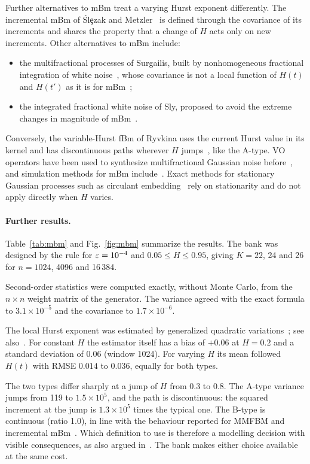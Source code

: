 Further alternatives to mBm treat a varying Hurst exponent differently. The incremental mBm of \'Sl\c{e}zak and Metzler~\cite{slezak2023} is defined through the covariance of its increments and shares the property that a change of $H$ acts only on new increments. Other alternatives to mBm include:
\begin{itemize}
\item the multifractional processes of Surgailis, built by nonhomogeneous fractional integration of white noise~\cite{surgailis2008}, whose covariance is not a local function of $H(t)$ and $H(t')$ as it is for mBm~\cite{bardet2013};
\item the integrated fractional white noise of Sly, proposed to avoid the extreme changes in magnitude of mBm~\cite{sly2007}.
\end{itemize}
Conversely, the variable-Hurst fBm of Ryvkina uses the current Hurst value in its kernel and has discontinuous paths wherever $H$ jumps~\cite{ryvkina2015}, like the A-type. VO operators have been used to synthesize multifractional Gaussian noise before~\cite{sheng2011}, and simulation methods for mBm include~\cite{chan1998}. Exact methods for stationary Gaussian processes such as circulant embedding~\cite{wood1994} rely on stationarity and do not apply directly when $H$ varies.

\paragraph{Further results.} Table~\ref{tab:mbm} and Fig.~\ref{fig:mbm} summarize the results. The bank was designed by the rule for $\varepsilon=10^{-4}$ and $0.05\le H\le0.95$, giving $K=22$, 24 and 26 for $n=1024$, 4096 and 16\,384.

Second-order statistics were computed exactly, without Monte Carlo, from the $n\times n$ weight matrix of the generator. The variance agreed with the exact formula to $3.1\times10^{-5}$ and the covariance to $1.7\times10^{-6}$.

The local Hurst exponent was estimated by generalized quadratic variations~\cite{istas1997,coeurjolly2005}; see also~\cite{bardet2013}. For constant $H$ the estimator itself has a bias of $+0.06$ at $H=0.2$ and a standard deviation of $0.06$ (window 1024). For varying $H$ its mean followed $H(t)$ with RMSE $0.014$ to $0.036$, equally for both types.

The two types differ sharply at a jump of $H$ from $0.3$ to $0.8$. The A-type variance jumps from 119 to $1.5\times10^5$, and the path is discontinuous: the squared increment at the jump is $1.3\times10^5$ times the typical one. The B-type is continuous (ratio 1.0), in line with the behaviour reported for MMFBM and incremental mBm~\cite{wang2023mmfbm,slezak2023}. Which definition to use is therefore a modelling decision with visible consequences, as also argued in~\cite{wang2023mmfbm}. The bank makes either choice available at the same cost.

